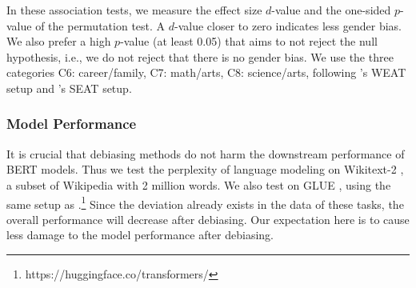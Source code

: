 %
In these association tests, we measure the effect size $d$-value and the
one-sided $p$-value of the permutation test.  A $d$-value closer to zero indicates less gender bias.  We also prefer a high $p$-value (at least 0.05) that aims to not reject the null hypothesis, i.e., we do not reject that there is no gender bias. We use the three categories C6: career/family, C7: math/arts, C8: science/arts, following 's WEAT setup and 's SEAT setup.

\subsubsection{Model Performance}
It is crucial that debiasing methods do not harm the downstream
performance of BERT models. Thus we test the perplexity of language modeling on Wikitext-2 \cite{merity2016pointer}, a subset of Wikipedia with 2 million words. We also test on GLUE  \cite{wang2018glue}, using the same setup as \cite{wolf2019huggingfaces}.\footnote{https://huggingface.co/transformers/}
Since the deviation already exists in the data of these tasks, 
the overall performance will decrease after debiasing. 
Our expectation here is to cause less damage to the model performance after debiasing.
